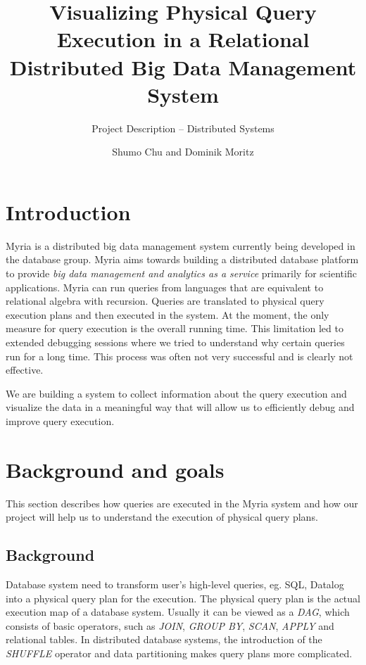\documentclass[11pt]{scrartcl}
\begin{document}

\title{Visualizing Physical Query Execution in a Relational Distributed Big Data Management System}
\subtitle{Project Description \--- Distributed Systems}
\author{Shumo Chu and Dominik Moritz}
\date{}

\maketitle

\section{Introduction}

Myria is a distributed big data management system currently being developed in the database group. Myria aims towards building a distributed database platform to provide \emph{big data management and analytics as a service} primarily for scientific applications. Myria can run queries from languages that are equivalent to relational algebra with recursion. Queries are translated to physical query execution plans and then executed in the system. At the moment, the only measure for query execution is the overall running time. This limitation led to extended debugging sessions where we tried to understand why certain queries run for a long time. This process was often not very successful and is clearly not effective.

We are building a system to collect information about the query execution and visualize the data in a meaningful way that will allow us to efficiently debug and improve query execution.


\section{Background and goals}

This section describes how queries are executed in the Myria system and how our project will help us to understand the execution of physical query plans.

\subsection{Background}
\label{sec:background}

Database system need to transform user's high-level queries, eg. SQL, Datalog into a physical query plan for the execution. The physical query plan is the actual execution map of a database system. Usually it can be viewed as a \emph{DAG}, which consists of basic operators, such as \emph{JOIN}, \emph{GROUP BY}, \emph{SCAN}, \emph{APPLY} and relational tables. In distributed database systems, the introduction of the \emph{SHUFFLE} operator and data partitioning makes query plans more complicated.
\end{document}
